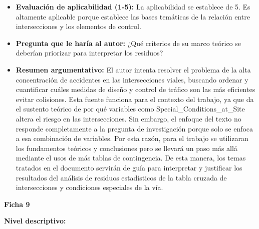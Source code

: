 \documentclass[12pt]{article}
\begin{document}
\begin{itemize}
	
	\item \textbf{Evaluación de aplicabilidad (1-5):}  La aplicabilidad se establece 
	de 5. Es altamente aplicable porque establece las bases temáticas de la relación 
	entre intersecciones y los elementos de control. \\  
	
	\item \textbf{Pregunta que le haría al autor:}  ¿Qué criterios de su marco teórico 
	se deberían priorizar para interpretar los residuos?
	
	\item \textbf{Resumen argumentativo:} El autor intenta resolver el problema de la 
	alta concentración de accidentes en las intersecciones viales, buscando ordenar 
	y cuantificar cuáles medidas de diseño y control de tráfico son las más eficientes 
	evitar colisiones. Esta fuente funciona para el contexto del trabajo, ya que da el 
	sustento teórico de por qué variables como Special\_Conditions\_at\_Site altera el
	riesgo en las intersecciones. Sin embargo, el enfoque del texto no responde completamente 
	a la pregunta de investigación porque solo se enfoca a esa combinación de variables. 
	Por esta razón, para el trabajo se utilizaran los fundamentos teóricos y conclusiones 
	pero se llevará un paso más allá mediante el usos de más tablas de contingencia. 
	De esta manera, los temas tratados en el documento servirán de guía para interpretar
	y justificar los resultados del análisis de residuos estadísticos de la tabla cruzada
	de intersecciones y condiciones especiales de la vía.\\
\end{itemize}
		

\textbf{Ficha 9}

\textbf{Nivel descriptivo:}
\end{document}
